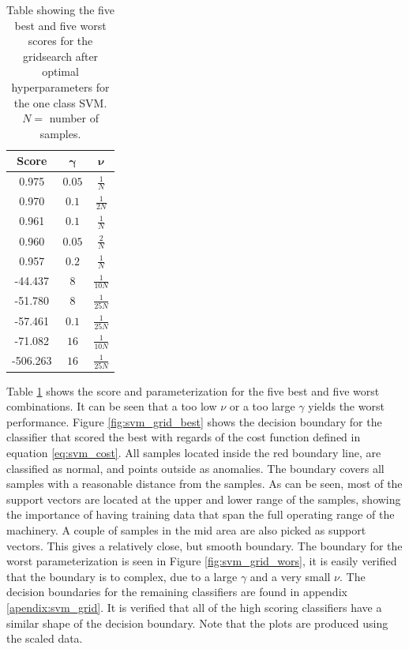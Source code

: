                 \begin{table}[h]
                    \centering
                    \begin{tabular}{ccc}
                        \toprule
                         \textbf{Score}  &   $\bm \gamma$    & $\bm \nu$         \\ \midrule
                         0.975  &   $0.05$      & $\frac{1}{N}$ \\ 
                         0.970  &   $0.1$      & $\frac{1}{2N}$ \\ 
                         0.961  &   $0.1$      & $\frac{1}{N}$ \\ 
                         0.960  &   $0.05$      & $\frac{2}{N}$ \\ 
                         0.957  &   $0.2$       & $\frac{1}{N}$ \\ 
                         -44.437  &   $8$      & $\frac{1}{10N}$ \\ 
                         -51.780  &   $8$      & $\frac{1}{25N}$ \\ 
                         -57.461  &   $0.1$      & $\frac{1}{25N}$ \\
                         -71.082  &   $16$      & $\frac{1}{10N}$ \\ 
                         -506.263  &   $16$      & $\frac{1}{25N}$ \\ \bottomrule
                         
                    \end{tabular}
                    \caption{Table showing the five best and five worst scores for the gridsearch after optimal hyperparameters for the one class SVM. $N = $ number of samples.}
                    \label{tab:svm_gridsearch}
                \end{table}
                
                Table \ref{tab:svm_gridsearch} shows the score and parameterization for the five best and five worst combinations. It can be seen that a too low $\nu$ or a too large $\gamma$ yields the worst performance. Figure \ref{fig:svm_grid_best} shows the decision boundary for the classifier that scored the best with regards of the cost function defined in equation \ref{eq:svm_cost}. All samples located inside the red boundary line, are classified as normal, and points outside as anomalies. The boundary covers all samples with a reasonable distance from the samples. As can be seen, most of the support vectors are located at the upper and lower range of the samples, showing the importance of having training data that span the full operating range of the machinery. A couple of samples in the mid area are also picked as support vectors. This gives a relatively close, but smooth boundary. The boundary for the worst parameterization is seen in Figure \ref{fig:svm_grid_wors}, it is easily verified that the boundary is to complex, due to a large $\gamma$ and a very small $\nu$. The decision boundaries for the remaining classifiers are found in appendix \ref{apendix:svm_grid}. It is verified that all of the high scoring classifiers have a similar shape of the decision boundary. Note that the plots are produced using the scaled data. 
                
